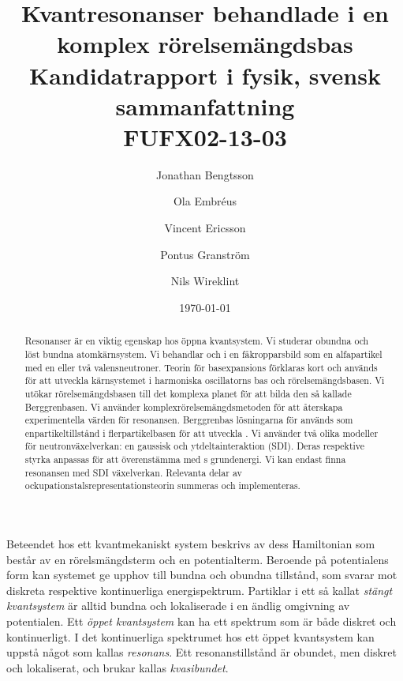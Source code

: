 \documentclass[12pt,a4paper]{article}
\begin{document}
  


\title{Kvantresonanser behandlade i en\\ komplex rörelsemängdsbas \\ 
\Large Kandidatrapport i fysik, svensk sammanfattning\\
FUFX02-13-03}
\author{Jonathan Bengtsson \and Ola Embréus \and Vincent Ericsson \and Pontus Granström \and Nils Wireklint}
\date{\today}
\maketitle
\newpage

\begin{abstract}
Resonanser är en viktig egenskap hos öppna kvantsystem. 
Vi studerar obundna och löst bundna atomkärnsystem.
Vi behandlar  och  i en fåkropparsbild som en alfapartikel med en eller två valensneutroner.
Teorin för basexpansions förklaras kort och används för att utveckla kärnsystemet i harmoniska oscillatorns bas och rörelsemängdsbasen.
Vi utökar rörelsemängdsbasen till det komplexa planet för att bilda den så kallade Berggrenbasen. 
Vi använder komplexrörelsemängdsmetoden för att återskapa experimentella värden för  resonansen.
Berggrenbas lösningarna för  används som enpartikeltillstånd i flerpartikelbasen för att utveckla . 
Vi använder två olika modeller för neutronväxelverkan: en gaussisk och ytdeltainteraktion (SDI). 
Deras respektive styrka anpassas för att överenstämma med s grundenergi.
Vi kan endast finna  resonansen med SDI växelverkan.
Relevanta delar av ockupationstalsrepresentationsteorin summeras och implementeras.


\end{abstract}




\newpage

Beteendet hos ett kvantmekaniskt system beskrivs av dess Hamiltonian som består av en rörelsmängdsterm och en potentialterm.
Beroende på potentialens form kan systemet ge upphov till bundna och obundna tillstånd, som svarar mot diskreta respektive kontinuerliga energispektrum.
Partiklar i ett så kallat \emph{stängt kvantsystem} är alltid bundna och lokaliserade i en ändlig omgivning av potentialen. 
Ett \emph{öppet kvantsystem} kan ha ett spektrum som är både diskret och kontinuerligt.
I det kontinuerliga spektrumet hos ett öppet kvantsystem kan uppstå något som kallas \emph{resonans}.
Ett resonanstillstånd är obundet, men diskret och lokaliserat, och brukar kallas \emph{kvasibundet}.
\end{document}
